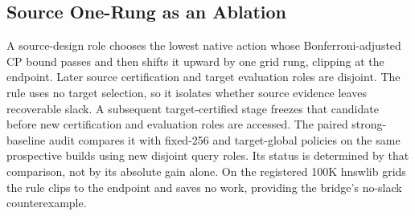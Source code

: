 \subsection{Source One-Rung as an Ablation}
\label{sec:slack-method}
A source-design role chooses the lowest native action whose Bonferroni-adjusted CP bound passes and then shifts it upward by one grid rung, clipping at the endpoint. Later source certification and target evaluation roles are disjoint. The rule uses no target selection, so it isolates whether source evidence leaves recoverable slack. A subsequent target-certified stage freezes that candidate before new certification and evaluation roles are accessed. The paired strong-baseline audit compares it with fixed-256 and target-global policies on the same prospective builds using new disjoint query roles. Its status is determined by that comparison, not by its absolute gain alone. On the registered 100K hnswlib grids the rule clips to the endpoint and saves no work, providing the bridge's no-slack counterexample.

